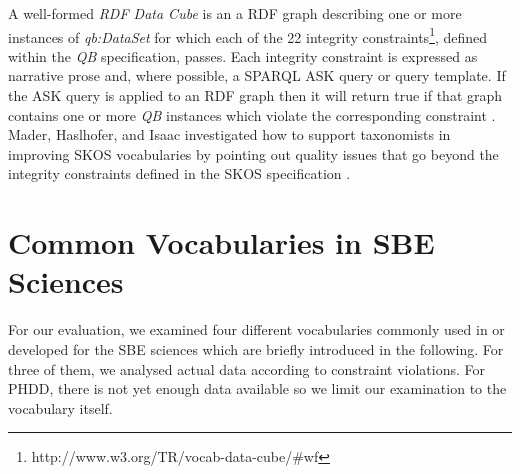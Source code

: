 \documentclass{llncs}
\newcommand{\ke}[1]{\todo[size=\small, color=red!40]{\textbf{Kai:} #1}}
\begin{document}

A well-formed \emph{RDF Data Cube} is an a RDF graph describing one or more instances of \emph{qb:DataSet} for which each of the 22 integrity constraints\footnote{http://www.w3.org/TR/vocab-data-cube/\#wf}, defined within the \emph{QB} specification, passes.
Each integrity constraint is expressed as narrative prose and, where possible, a SPARQL ASK query or query template. 
If the ASK query is applied to an RDF graph then it will return true if that graph contains one or more \emph{QB} instances which violate the corresponding constraint \cite{CyganiakReynolds2014}.
Mader, Haslhofer, and Isaac investigated how to support
taxonomists in improving SKOS vocabularies by pointing out quality
issues that go beyond the integrity constraints defined in the SKOS specification \cite{MaderHaslhoferIsaac2012}.

\section{Common Vocabularies in SBE Sciences}
\label{rdf-representation}


For our evaluation, we examined four different vocabularies commonly used in or developed for the SBE sciences which are briefly introduced in the following. For three of them, we analysed actual data according to constraint violations. For PHDD, there is not yet enough data available so we limit our examination to the vocabulary itself.\ke{Neuer Absatz von mir...}
\end{document}
